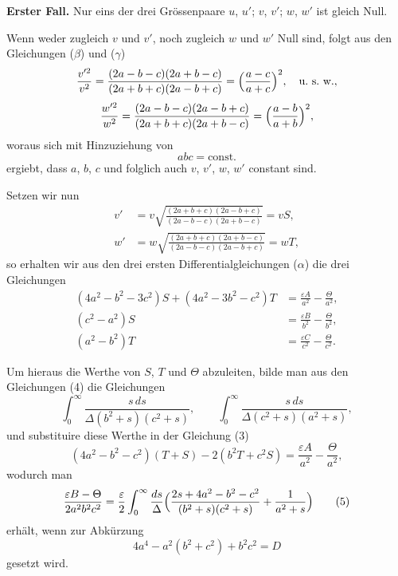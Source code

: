 \documentclass[12pt,a4paper]{book}
\theoremstyle{definition}
\theoremstyle{remark}
\begin{document}
\begin{center}
\textbf{Erster Fall.} Nur eins der drei Gr\"ossenpaare $u$, $u'$; $v$, $v'$; $w$, $w'$ ist gleich Null.
\end{center}

Wenn weder zugleich $v$ und $v'$, noch zugleich $w$ und $w'$ Null sind, folgt aus den Gleichungen ($\beta$) und ($\gamma$)
\[
\frac{v'^{2}}{v^{2}} = \frac{(2a - b - c)(2a + b - c)}{(2a + b + c)(2a - b + c)} = \Bigl(\frac{a - c}{a + c}\Bigr)^{2},\quad\text{u.~s.~w.},
\]
\[
\frac{w'^{2}}{w^{2}} = \frac{(2a - b - c)(2a - b + c)}{(2a + b + c)(2a + b - c)} = \Bigl(\frac{a - b}{a + b}\Bigr)^{2},
\]
woraus sich mit Hinzuziehung von
\[
abc = \text{const.}
\]
ergiebt, dass $a$, $b$, $c$ und folglich auch $v$, $v'$, $w$, $w'$ constant sind.

Setzen wir nun
\begin{align*}
v' &= v\sqrt{\frac{(2a + b + c)(2a - b + c)}{(2a - b - c)(2a + b - c)}} = vS,\\
w' &= w\sqrt{\frac{(2a + b + c)(2a + b - c)}{(2a - b - c)(2a - b + c)}} = wT,\tag{2}
\end{align*}
so erhalten wir aus den drei ersten Differentialgleichungen ($\alpha$) die drei Gleichungen
\begin{align*}
(4a^{2} - b^{2} - 3c^{2})S + (4a^{2} - 3b^{2} - c^{2})T &= \frac{\varepsilon A}{a^{2}} - \frac{\Theta}{a^{2}},\\
(c^{2} - a^{2})S &= \frac{\varepsilon B}{b^{2}} - \frac{\Theta}{b^{2}},\\
(a^{2} - b^{2})T &= \frac{\varepsilon C}{c^{2}} - \frac{\Theta}{c^{2}}.\tag{3,4}
\end{align*}

Um hieraus die Werthe von $S$, $T$ und $\Theta$ abzuleiten, bilde man aus den Gleichungen (4) die Gleichungen
\[
\int_{0}^{\infty}\frac{s\,ds}{\Delta(b^{2} + s)(c^{2} + s)},\qquad \int_{0}^{\infty}\frac{s\,ds}{\Delta(c^{2} + s)(a^{2} + s)},
\]
und substituire diese Werthe in der Gleichung (3)
\[
(4a^{2} - b^{2} - c^{2})(T + S) - 2(b^{2}T + c^{2}S) = \frac{\varepsilon A}{a^{2}} - \frac{\Theta}{a^{2}},
\]
wodurch man
\begin{equation*}
\frac{\varepsilon B - \Theta}{2a^{2}b^{2}c^{2}} = \frac{\varepsilon}{2}\int_{0}^{\infty}\frac{ds}{\Delta}\Bigl(\frac{2s + 4a^{2} - b^{2} - c^{2}}{(b^{2} + s)(c^{2} + s)} + \frac{1}{a^{2} + s}\Bigr)\tag{5}
\end{equation*}
erh\"alt, wenn zur Abk\"urzung
\begin{equation*}
4a^{4} - a^{2}(b^{2} + c^{2}) + b^{2}c^{2} = D\tag{6}
\end{equation*}
gesetzt wird.
\end{document}
